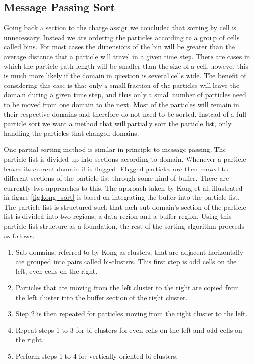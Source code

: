 	\subsection{Message Passing Sort}
	Going back a section to the charge assign we concluded that sorting by cell is unnecessary. Instead we are ordering the particles according to a group of cells called bins. For most cases the dimensions of the bin will be greater than the average distance that a particle will travel in a given time step. There are cases in which the particle path length will be smaller than the size of a cell, however this is much more likely if the domain in question is several cells wide. The benefit of considering this case is that only a small fraction of the particles will leave the domain during a given time step, and thus only a small number of particles need to be moved from one domain to the next. Most of the particles will remain in their respective domains and therefore do not need to be sorted. Instead of a full particle sort we want a method that will partially sort the particle list, only handling the particles that changed domains. 

	One partial sorting method is similar in principle to message passing. The particle list is divided up into sections according to domain. Whenever a particle leaves its current domain it is flagged. Flagged particles are then moved to different sections of the particle list through some kind of buffer. There are currently two approaches to this. The approach taken by Kong et al, illustrated in figure \ref{fig:kong_sort} is based on integrating the buffer into the particle list. The particle list is structured such that each sub-domain's section of the particle list is divided into two regions, a data region and a buffer region. Using this particle list structure as a foundation, the rest of the sorting algorithm proceeds as follows\cite{Kong2011}:

\begin{enumerate}
\singlespace
\item Sub-domains, referred to by Kong as clusters, that are adjacent horizontally are grouped into pairs called bi-clusters. This first step is odd cells on the left, even cells on the right. 
\item Particles that are moving from the left cluster to the right are copied from the left cluster into the buffer section of the right cluster. 
\item Step 2 is then repeated for particles moving from the right cluster to the left. 
\item Repeat steps 1 to 3 for bi-clusters for even cells on the left and odd cells on the right. 
\item Perform steps 1 to 4 for vertically oriented bi-clusters. 
\end{enumerate}


